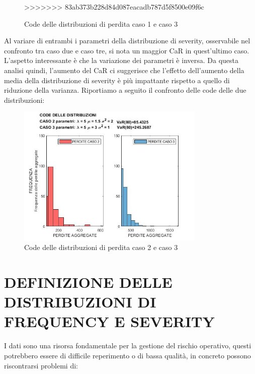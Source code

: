\documentclass[titlepage]{article}
\begin{document}
\begin{itemize}
{\begin{figure}[htbp]
>>>>>>> 83ab373b228d84d087eacadb787d5f8500e09f6c
	\caption{\label{fig:CODE 1VS3.jpg}Code delle distribuzioni di perdita caso 1 e caso 3}
\end{figure}

		Al variare di entrambi i parametri della distribuzione di severity, osservabile nel confronto tra caso due e caso tre, si nota un maggior CaR in quest’ultimo caso. L’aspetto interessante è che la variazione dei parametri è inversa. Da questa analisi quindi, l’aumento del CaR ci suggerisce che l’effetto dell’aumento della media della distribuzione di severity è più impattante rispetto a quello di riduzione della varianza. Riportiamo a seguito il confronto delle code delle due distribuzioni:
\begin{figure}[htbp]
	\centering
	\includegraphics[width=0.8\textwidth]{CODE2VS3.jpg}
	\caption{\label{fig:CODE 2VS3.jpg}Code delle distribuzioni di perdita caso 2 e caso 3}
\end{figure}
\newpage
\section{DEFINIZIONE DELLE DISTRIBUZIONI DI FREQUENCY E SEVERITY}
 I dati sono una risorsa fondamentale per la gestione del rischio operativo, questi potrebbero essere di difficile reperimento o di bassa qualità, in concreto possono riscontrarsi problemi di:
 \begin{itemize}
 	


\end{itemize}}
\end{itemize}
\end{document}
